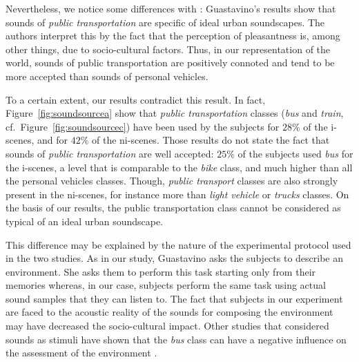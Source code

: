 \documentclass[12pt]{elsarticle}
\newcommand{\cf}{cf.}
\begin{document}
Nevertheless, we notice some differences with \cite{guastavino2006ideal}: Guastavino’s results show that sounds of \emph{public transportation} are specific of ideal urban soundscapes. The authors interpret this by the fact that the perception of pleasantness is, among other things, due to socio-cultural factors. Thus, in our representation of the world, sounds of public transportation are positively connoted and tend to be more accepted than sounds of personal vehicles.

To a certain extent, our results contradict this result. In fact,  Figure~\ref{fig:soundsourcea} show that \emph{public transportation} classes (\emph{bus} and \emph{train}, \cf~Figure~\ref{fig:soundsourcec}) have been used by the subjects for $28\%$ of the i-scenes, and for $42\%$ of the ni-scenes. Those results do not state the fact that sounds of \emph{public transportation} are well accepted: $25\%$ of the subjects used \emph{bus} for the i-scenes, a level that is comparable to the \emph{bike} class, and much higher than all the personal vehicles classes. Though, \emph{public transport} classes are also strongly present in the ni-scenes, for instance more than \emph{light vehicle} or \emph{trucks} classes. On the basis of our results, the public transportation class cannot be considered as typical of an ideal urban soundscape.


This difference may be explained by the nature of the experimental protocol used in the two studies. As in our study, Guastavino asks the subjects to describe an environment. She asks them to perform this task starting only from their memories whereas, in our case, subjects perform the same task using actual sound samples that they can listen to. The fact that subjects in our experiment are faced to the acoustic reality of the sounds for composing the environment may have decreased the socio-cultural impact. Other studies that considered sounds as stimuli have shown that the \emph{bus} class can have a negative influence on the assessment of the environment \cite{lavandier2006contribution}.
\end{document}
